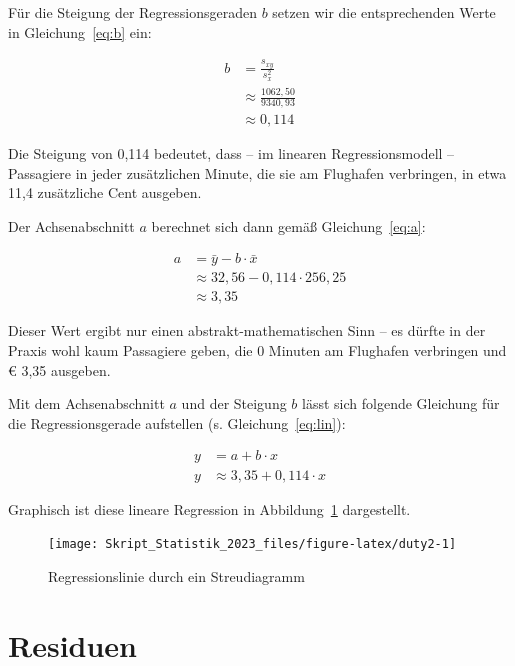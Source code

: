 \documentclass[
  11pt,
  ngerman,
  a4paper,
]{report}
\begin{document}
Für die Steigung der Regressionsgeraden \(b\) setzen wir die entsprechenden Werte in Gleichung~\eqref{eq:b} ein:

\nopagebreak

\[
\begin{aligned}
b&=\frac{s_{xy}}{s^2_x}\\
 &\approx\frac{1062{,}50}{9340{,}93}\\
 &\approx0{,}114
\end{aligned}
\]

Die Steigung von 0,114 bedeutet, dass -- im linearen Regressionsmodell -- Passagiere in jeder zusätzlichen Minute, die sie am Flughafen verbringen, in etwa 11,4 zusätzliche Cent ausgeben.

Der Achsenabschnitt \(a\) berechnet sich dann gemäß Gleichung~\eqref{eq:a}:

\nopagebreak

\[
\begin{aligned}
a&=\bar{y}-b\cdot\bar{x}\\
&\approx 32{,}56-0{,}114\cdot256{,}25\\
&\approx 3{,}35
\end{aligned}
\]

Dieser Wert ergibt nur einen abstrakt-mathematischen Sinn -- es dürfte in der Praxis wohl kaum Passagiere geben, die 0 Minuten am Flughafen verbringen und € 3,35 ausgeben.

Mit dem Achsenabschnitt \(a\) und der Steigung \(b\) lässt sich folgende Gleichung für die Regressionsgerade aufstellen (s. Gleichung~\eqref{eq:lin}):

\[
\begin{aligned}
y&=a+b\cdot x\\
y&\approx3{,}35 + 0{,}114 \cdot x
\end{aligned}
\]

Graphisch ist diese lineare Regression in Abbildung~\ref{fig:duty2} dargestellt.

\begin{figure}[!h]

{\centering \texttt{[image: Skript\_Statistik\_2023\_files/figure-latex/duty2-1]} 

}

\caption{Regressionslinie durch ein Streudiagramm}\label{fig:duty2}
\end{figure}

\hypertarget{residuen}{%
\section{Residuen}\label{residuen}}
\end{document}

